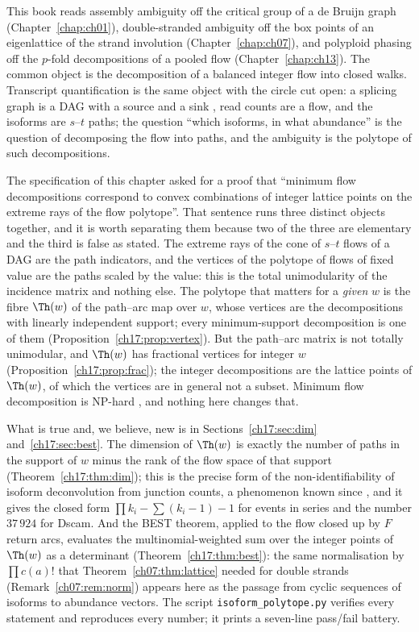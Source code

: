 This book reads assembly ambiguity off the critical group of a de Bruijn graph
(Chapter~\ref{chap:ch01}), double-stranded ambiguity off the box points of an eigenlattice of the
strand involution (Chapter~\ref{chap:ch07}), and polyploid phasing off the $p$-fold decompositions
of a pooled flow (Chapter~\ref{chap:ch13}). The common object is the decomposition of a balanced integer flow
into closed walks. Transcript quantification is the same object with the circle cut open: a
splicing graph is a DAG with a source and a sink \cite{HAST02}, read counts are a flow, and
the isoforms are $s$--$t$ paths; the question ``which isoforms, in what abundance'' is the
question of decomposing the flow into paths, and the ambiguity is the polytope of such
decompositions.

The specification of this chapter asked for a proof that ``minimum flow decompositions
correspond to convex combinations of integer lattice points on the extreme rays of the flow
polytope''. That sentence runs three distinct objects together, and it is worth separating
them because two of the three are elementary and the third is false as stated. The extreme
rays of the cone of $s$--$t$ flows of a DAG are the path indicators, and the vertices of the
polytope of flows of fixed value are the paths scaled by the value: this is the total
unimodularity of the incidence matrix and nothing else. The polytope that matters for a
\emph{given} $w$ is the fibre $\Th(w)$ of the path--arc map over $w$, whose vertices are the
decompositions with linearly independent support; every minimum-support decomposition is one
of them (Proposition~\ref{ch17:prop:vertex}). But the path--arc matrix is not totally unimodular,
and $\Th(w)$ has fractional vertices for integer $w$ (Proposition~\ref{ch17:prop:frac}); the
integer decompositions are the lattice points of $\Th(w)$, of which the vertices are in
general not a subset. Minimum flow decomposition is NP-hard \cite{HHKS12}, and nothing here
changes that.

What is true and, we believe, new is in Sections~\ref{ch17:sec:dim} and~\ref{ch17:sec:best}. The
dimension of $\Th(w)$ is exactly the number of paths in the support of $w$ minus the rank of
the flow space of that support (Theorem~\ref{ch17:thm:dim}); this is the precise form of the
non-identifiability of isoform deconvolution from junction counts, a phenomenon known since
\cite{LSGB08,HJXW09}, and it gives the closed form $\prod k_i-\sum(k_i-1)-1$ for events in
series and the number $37\,924$ for Dscam. And the BEST theorem, applied to the flow closed
up by $F$ return arcs, evaluates the multinomial-weighted sum over the integer points of
$\Th(w)$ as a determinant (Theorem~\ref{ch17:thm:best}): the same normalisation by
$\prod c(a)!$ that Theorem~\ref{ch07:thm:lattice} needed for double strands
(Remark~\ref{ch07:rem:norm}) appears here as the passage from
cyclic sequences of isoforms to abundance vectors. The script
\texttt{isoform\_polytope.py} verifies every statement and reproduces every number; it prints
a seven-line pass/fail battery.

